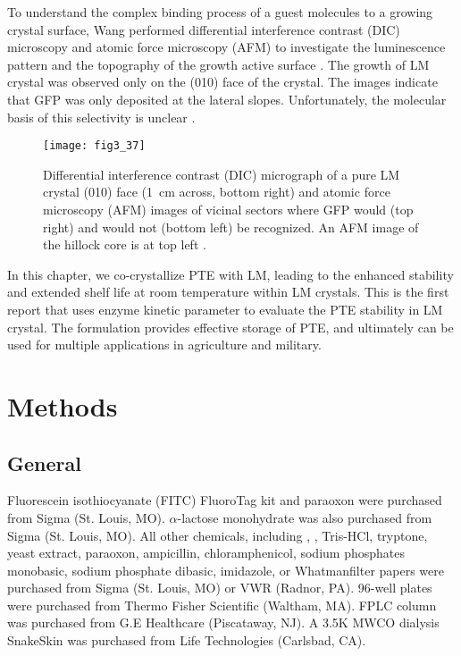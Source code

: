 \begin{refsection}
To understand the complex binding process of a guest molecules to a growing
crystal surface, Wang  performed differential interference
contrast (DIC) microscopy and atomic force microscopy (AFM) to investigate the
luminescence pattern and the topography of the growth active surface
\cite{Wang2001a}. The growth of LM crystal was observed only on the (010) face
of the crystal. The images indicate that GFP was only deposited at the lateral
slopes.  Unfortunately, the molecular basis of this selectivity is unclear
\cite{Wang2001a}.
\begin{figure}[htbp] \centering \texttt{[image: fig3\_37]}
    \caption[Differential interference
contrast (DIC) micrograph of a pure LM crystal (010) face (\SI{1}{\cm} across,
bottom right) and atomic force microscopy (AFM) images of vicinal sectors where
GFP would (top right) and would not (bottom left) be recognized. An AFM image
of the hillock core is at top left.]{Differential interference contrast (DIC)
    micrograph of a pure LM crystal (010) face (\SI{1}{\cm} across, bottom
    right) and atomic force microscopy (AFM) images of vicinal sectors where
    GFP would (top right) and would not (bottom left) be recognized. An AFM
    image of the hillock core is at top left \cite{Wang2001a}.}
    \label{fig:010}
\end{figure}

In this chapter, we co-crystallize PTE with LM, leading to the enhanced
stability and extended shelf life at room temperature within LM crystals. This
is the first report that uses enzyme kinetic parameter to evaluate the PTE
stability in LM crystal. The formulation provides effective storage of PTE, and
ultimately can be used for multiple applications in agriculture and military. 

\section{Methods}

\subsection{General}

Fluorescein isothiocyanate (FITC) FluoroTag kit and paraoxon were purchased
from Sigma (St. Louis, MO).  $\alpha$-lactose monohydrate was also purchased
from Sigma (St. Louis, MO). All other chemicals, including ,
, Tris-HCl, tryptone, yeast extract, paraoxon, ampicillin,
chloramphenicol, sodium phosphates monobasic, sodium phosphate dibasic,
imidazole, or Whatman\textregistered filter papers were purchased from Sigma
(St. Louis, MO) or VWR (Radnor, PA).  96-well plates were purchased from Thermo
Fisher Scientific (Waltham, MA). FPLC column was purchased from G.E Healthcare
(Piscataway, NJ). A 3.5K MWCO dialysis SnakeSkin was purchased from Life
Technologies (Carlsbad, CA).


\end{refsection}
